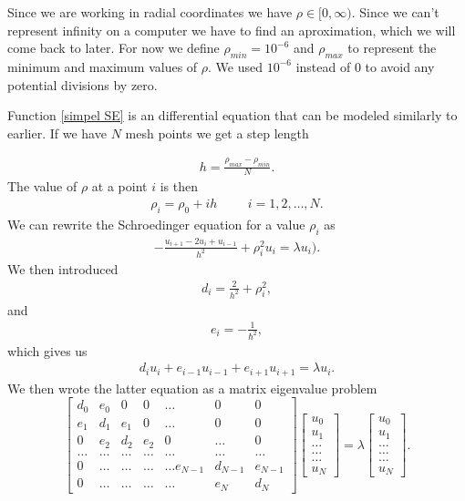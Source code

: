 \documentclass[a4paper]{article}
\begin{document}
Since we are working in radial coordinates we have $\rho \in [0,\infty)$. Since we can't represent infinity on a computer we have to find an aproximation, which we will come back to later. For now we define $\rho_{min}=10^{-6}$ and $\rho_{max}$ to represent the  minimum and maximum values of $\rho$. We used $10^{-6}$ instead of $0$ to avoid any potential divisions by zero.

Function \ref{simpel SE} is an differential equation that can be modeled similarly to earlier. If we have $N$ mesh points we get a step length

\begin{align}
h = \frac{\rho_{max} - \rho_{min}}{N}.
\end{align}
The value of $\rho$ at a point $i$ is then 
\begin{align}
\rho_i= \rho_0 + ih \hspace{1cm} i=1,2,\dots , N.
\end{align}
We can rewrite the Schroedinger equation for a value $\rho_i$ as
\begin{align}
-\frac{u_{i+1} -2u_i +u_{i-1}}{h^2}+\rho_i^2u_i = \lambda u_i).
\end{align}
We then introduced
\begin{align}
   d_i=\frac{2}{h^2}+\rho_{i}^2,
\end{align}
and
\begin{align}
e_{i} = -\frac{1}{\hbar^2},
\end{align}
which gives us
\begin{align}
d_iu_i+e_{i-1}u_{i-1}+e_{i+1}u_{i+1}  = \lambda u_i.
\end{align}
We then wrote the latter equation as a matrix eigenvalue problem
\begin{equation}
\begin{bmatrix}d_0 & e_0 & 0   & 0    & \dots  &0     & 0 \\
e_1 & d_1 & e_1 & 0    & \dots  &0     &0 \\
0   & e_2 & d_2 & e_2  &0       &\dots & 0\\
\dots  & \dots & \dots & \dots  &\dots      &\dots & \dots\\
0   & \dots & \dots & \dots  &\dots  e_{N-1}     &d_{N-1} & e_{N-1}\\
0   & \dots & \dots & \dots  &\dots       &e_{N} & d_{N}
\end{bmatrix}  \begin{bmatrix} u_{0} \\
u_{1} \\
\dots\\ \dots\\ \dots\\
u_{N}
\end{bmatrix}=\lambda \begin{bmatrix} u_{0} \\
u_{1} \\
\dots\\ \dots\\ \dots\\
u_{N}
\end{bmatrix}.  
\label{eq:sematrix}
\end{equation}
\end{document}
